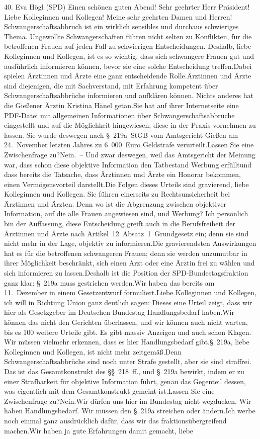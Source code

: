 \documentclass{article}
\begin{document}
	40. Eva Högl (SPD) Einen schönen guten Abend! Sehr geehrter Herr Präsident! Liebe Kolleginnen und Kollegen! Meine sehr geehrten Damen und Herren! Schwangerschaftsabbruch ist ein wirklich sensibles und durchaus schwieriges Thema. Ungewollte Schwangerschaften führen nicht selten zu Konflikten, für die betroffenen Frauen auf jeden Fall zu schwierigen Entscheidungen. Deshalb, liebe Kolleginnen und Kollegen, ist es so wichtig, dass sich schwangere Frauen gut und ausführlich informieren können, bevor sie eine solche Entscheidung treffen.Dabei spielen Ärztinnen und Ärzte eine ganz entscheidende Rolle.Ärztinnen und Ärzte sind diejenigen, die mit Sachverstand, mit Erfahrung kompetent über Schwangerschaftsabbrüche informieren und aufklären können. Nichts anderes hat die Gießener Ärztin Kristina Hänel getan.Sie hat auf ihrer Internetseite eine PDF-Datei mit allgemeinen Informationen über Schwangerschaftsabbrüche eingestellt und auf die Möglichkeit hingewiesen, diese in der Praxis vornehmen zu lassen. Sie wurde deswegen nach § 219a StGB vom Amtsgericht Gießen am 24. November letzten Jahres zu 6 000 Euro Geldstrafe verurteilt.Lassen Sie eine Zwischenfrage zu?Nein. – Und zwar deswegen, weil das Amtsgericht der Meinung war, dass schon diese objektive Information den Tatbestand Werbung erfülltund dass bereits die Tatsache, dass Ärztinnen und Ärzte ein Honorar bekommen, einen Vermögensvorteil darstellt.Die Folgen dieses Urteils sind gravierend, liebe Kolleginnen und Kollegen. Sie führen einerseits zu Rechtsunsicherheit bei Ärztinnen und Ärzten. Denn wo ist die Abgrenzung zwischen objektiver Information, auf die alle Frauen angewiesen sind, und Werbung? Ich persönlich bin der Auffassung, diese Entscheidung greift auch in die Berufsfreiheit der Ärztinnen und Ärzte nach Artikel 12 Absatz 1 Grundgesetz ein; denn sie sind nicht mehr in der Lage, objektiv zu informieren.Die gravierendsten Auswirkungen hat es für die betroffenen schwangeren Frauen; denn sie werden unzumutbar in ihrer Möglichkeit beschränkt, sich einen Arzt oder eine Ärztin frei zu wählen und sich informieren zu lassen.Deshalb ist die Position der SPD-Bundestagsfraktion ganz klar: § 219a muss gestrichen werden.Wir haben das bereits am 11. Dezember in einem Gesetzentwurf formuliert.Liebe Kolleginnen und Kollegen, ich will in Richtung Union ganz deutlich sagen: Dieses eine Urteil zeigt, dass wir hier als Gesetzgeber im Deutschen Bundestag Handlungsbedarf haben.Wir können das nicht den Gerichten überlassen, und wir können auch nicht warten, bis es 100 weitere Urteile gibt. Es gibt massiv Anzeigen und auch schon Klagen. Wir müssen vielmehr erkennen, dass es hier Handlungsbedarf gibt.§ 219a, liebe Kolleginnen und Kollegen, ist nicht mehr zeitgemäß.Denn Schwangerschaftsabbrüche sind noch unter Strafe gestellt, aber sie sind straffrei. Das ist das Gesamtkonstrukt des §§ 218 ff., und § 219a bewirkt, indem er zu einer Strafbarkeit für objektive Information führt, genau das Gegenteil dessen, was eigentlich mit dem Gesamtkonstrukt gemeint ist.Lassen Sie eine Zwischenfrage zu?Nein.Wir dürfen uns hier im Bundestag nicht wegducken. Wir haben Handlungsbedarf. Wir müssen den § 219a streichen oder ändern.Ich werbe noch einmal ganz ausdrücklich dafür, dass wir das fraktionsübergreifend machen.Wir haben ja gute Erfahrungen damit gemacht, liebe 
\end{document}
